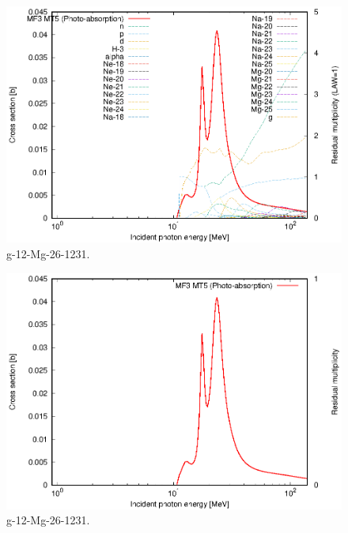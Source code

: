 \begin{figure}
 \includegraphics[width=\linewidth]{eps/g_12-Mg-26_1231.eps}
  \caption{g-12-Mg-26-1231.}
\end{figure}
\begin{figure}
 \includegraphics[width=\linewidth]{eps-law0/g_12-Mg-26_1231.eps}
 \caption{g-12-Mg-26-1231.}
\end{figure}
\newpage \clearpage

